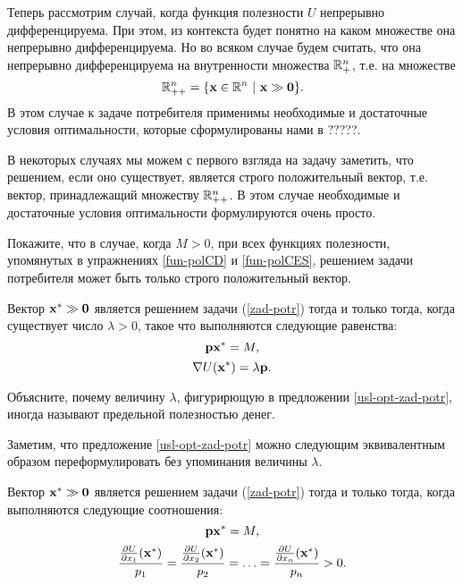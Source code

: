     Теперь рассмотрим случай, когда функция полезности $U$ непрерывно
    дифференцируема. При этом, из контекста будет понятно на каком
    множестве она непрерывно дифференцируема. Но во всяком случае
    будем считать, что
    она непрерывно дифференцируема на внутренности множества
    $\mathbb{R}_{+}^{n}$, т.е. на множестве
    \[\R_{++}^{n}=\{\vc{x}\in \R^{n} \ | \ \vc{x}\gg\vc{0}\}.\]
    В этом случае к задаче потребителя применимы необходимые и
    достаточные условия оптимальности, которые сформулированы нами в
    ?????.

    В некоторых случаях мы можем с первого взгляда на задачу
    заметить, что решением, если оно существует, является строго
    положительный вектор, т.е. вектор, принадлежащий множеству
    $\mathbb{R}_{++}^{n}$. В этом случае необходимые и достаточные условия
    оптимальности формулируются очень просто.



\begin{exer}
    Покажите, что в случае, когда $M>0$, при
    всех функциях полезности, упомянутых в упражнениях
    \ref{fun-polCD} и \ref{fun-polCES},
    решением задачи потребителя может быть только строго
    положительный вектор.
\end{exer}


\begin{prop}
    \label{usl-opt-zad-potr}
    Вектор $\mathbf{x^{*}}\gg\mathbf{0}$ является решением задачи
    (\ref{zad-potr}) тогда и только тогда, когда существует число
    $\lambda>0$, такое что выполняются следующие равенства:
    \[\mathbf{p}\mathbf{x^{*}}=M,\]
    \[\nabla U(\mathbf{x^{*}})=\lambda\mathbf{p}.\]
\end{prop}

\begin{exer}
    Объясните, почему величину $\lambda$, фигурирющую в
    предложении \ref{usl-opt-zad-potr}, иногда называют предельной
    полезностью денег.
\end{exer}

    Заметим, что предложение \ref{usl-opt-zad-potr} можно следующим
    эквивалентным образом переформулировать без упоминания величины
    $\lambda$.

\begin{prop}
    \label{usl-opt-zad-potr-1}
    Вектор $\mathbf{x^{*}}\gg\mathbf{0}$ является решением задачи
    (\ref{zad-potr}) тогда и только тогда, когда выполняются следующие соотношения:
    \[\mathbf{p}\mathbf{x^{*}}=M,\]
    \[\frac{\frac{\partial U}{\partial x_{1}}(\mathbf{x^{*}})}{p_{1}}=
    \frac{\frac{\partial U}{\partial x_{2}}(\mathbf{x^{*}})}{p_{2}}=
    \ldots=\frac{\frac{\partial U}{\partial x_{n}}(\mathbf{x^{*}})}{p_{n}}>0.\]
\end{prop}

